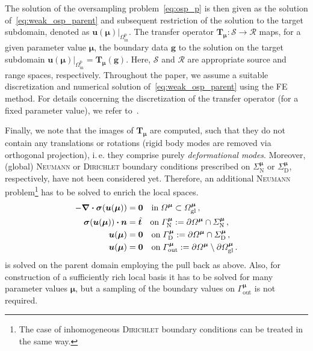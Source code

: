 \documentclass[a4paper]{eccomas_paper-2024}
\makeatletter
\newcommand{\ie}{i.\,e.\@\xspace}
\newcommand{\m}{\bm\mu}
\newcommand{\p}{\mathrm{p}}
\newcommand{\out}{\mathrm{out}}
\newcommand{\inrm}{\mathrm{in}}
\makeatother
\begin{document}
The solution of the oversampling problem~\cref{eq:osp_p} is then given as the solution of~\cref{eq:weak_osp_parent} and subsequent restriction of the solution to the target subdomain, denoted as $\bm{u}(\m)\big\vert_{\varOmega^{\p}_{\inrm}}$.
The transfer operator $\bm{T}_{\m}: \mathcal{S}\to\mathcal{R}$ maps, for a given parameter value $\m$, the boundary data $\bm{g}$ to the solution on the target subdomain $\bm{u}(\m)\big\vert_{\varOmega^{\p}_{\inrm}} = \bm{T}_{\m}(\bm{g}).$
Here, $\mathcal{S}$ and $\mathcal{R}$ are appropriate source and range spaces, respectively.
Throughout the paper, we assume a suitable discretization and numerical solution of~\cref{eq:weak_osp_parent} using the FE method.
For details concerning the discretization of the transfer operator (for a fixed parameter value), we refer to~\cite{Buhr2018Randomized}.

Finally, we note that the images of $\bm{T}_{\m}$ are computed, such that they do not contain any translations or rotations (rigid body modes are removed via orthogonal projection), \ie{} they comprise purely \textit{deformational modes}.
Moreover, (global) \textsc{Neumann} or \textsc{Dirichlet} boundary conditions prescribed on $\varSigma^{\m}_{\mathrm{N}}$ or $\varSigma^{\m}_{\mathrm{D}}$, respectively, have not been considered yet.
Therefore, an additional \textsc{Neumann} problem\footnote{The case of inhomogeneous \textsc{Dirichlet} boundary conditions can be treated in the same way.} has to be solved to enrich the local spaces.
\begin{align}
	\begin{split}
	\label{eq:neumann_problem}
    - \div{\bm{\sigma}} (\bm{u}(\bm\mu)) &= \bm{0} \quad  \mathrm{in}\;{\varOmega^{\bm\mu}}\subset\varOmega^{\bm\mu}_{\mathrm{gl}}\,,\\
    \bm{\sigma}(\bm{u}(\bm\mu)) \vdot \bm{n} &= \hat{\bm{t}} \quad \mathrm{on}\; \varGamma^{\m}_{\mathrm{N}}:= \partial\varOmega^{\m}\cap\varSigma^{\m}_{\mathrm{N}}\,,\\
    \bm{u}(\bm\mu) &= \bm{0} \quad  \mathrm{on}\;\varGamma^{\m}_{\mathrm{D}}:=\partial\varOmega^{\m}\cap\varSigma^{\m}_{\mathrm{D}}\,,\\
    \bm{u}(\bm\mu) &= \bm{0}\quad\mathrm{on}\;\varGamma^{\m}_{\mathrm{out}}:= \partial\varOmega^{\m} \setminus\partial\varOmega^{\m}_{\mathrm{gl}}\,.
	\end{split}
\end{align}
 is solved on the parent domain employing the pull back as above.
Also, for construction of a sufficiently rich local basis it has to be solved for many parameter values $\m$, but a sampling of the boundary values on $\varGamma^{\m}_{\out}$ is not required.
\end{document}
